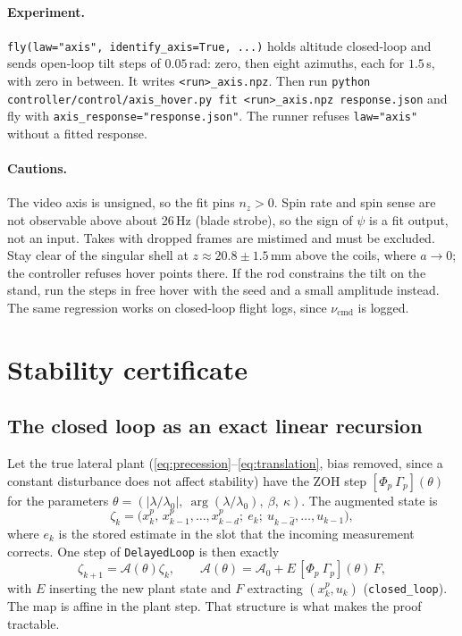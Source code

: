 \documentclass[11pt]{article}
\begin{document}
\paragraph{Experiment.} \texttt{fly(law="axis", identify\_axis=True, ...)} holds altitude closed-loop
and sends open-loop tilt steps of $0.05$\,rad: zero, then eight azimuths, each for $1.5$\,s, with
zero in between. It writes \texttt{<run>\_axis.npz}. Then run
\texttt{python controller/control/axis\_hover.py fit <run>\_axis.npz response.json} and fly with
\texttt{axis\_response="response.json"}. The runner refuses \texttt{law="axis"} without a fitted
response.

\paragraph{Cautions.} The video axis is unsigned, so the fit pins $n_z>0$. Spin rate and spin sense
are not observable above about 26\,Hz (blade strobe), so the sign of $\psi$ is a fit output, not an
input. Takes with dropped frames are mistimed and must be excluded. Stay clear of the singular shell
at $z\approx20.8\pm1.5$\,mm above the coils, where $a\to0$; the controller refuses hover points there.
If the rod constrains the tilt on the stand, run the steps in free hover with the seed and a small
amplitude instead. The same regression works on closed-loop flight logs, since $\nu_{\mathrm{cmd}}$
is logged.

\section{Stability certificate}
\label{sec:proof}

\subsection{The closed loop as an exact linear recursion}
Let the true lateral plant (\eqref{eq:precession}--\eqref{eq:translation}, bias removed, since a
constant disturbance does not affect stability) have the ZOH step $[\Phi_p\ \Gamma_p](\theta)$ for
the parameters
$\theta=(|\lambda/\lambda_0|,\ \arg(\lambda/\lambda_0),\ \beta,\ \kappa)$. The augmented state is
\[
\zeta_k=\big(x^p_k,\,x^p_{k-1},\dots,x^p_{k-d};\ e_k;\ u_{k-\hat d},\dots,u_{k-1}\big),
\]
where $e_k$ is the stored estimate in the slot that the incoming measurement corrects. One step of
\texttt{DelayedLoop} is then exactly
\[
\zeta_{k+1}=\mathcal A(\theta)\zeta_k,\qquad \mathcal A(\theta)=\mathcal A_0+E\,[\Phi_p\ \Gamma_p](\theta)\,F ,
\]
with $E$ inserting the new plant state and $F$ extracting $(x^p_k,u_k)$ (\texttt{closed\_loop}). The
map is affine in the plant step. That structure is what makes the proof tractable.
\end{document}
